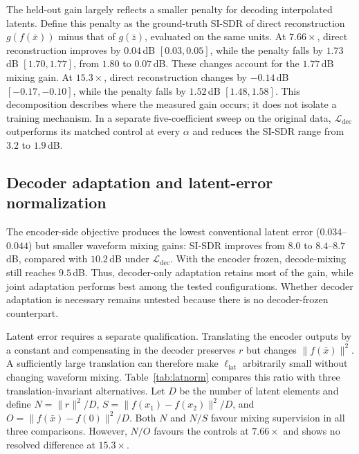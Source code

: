 \documentclass[conference]{IEEEtran}
\newcommand{\tabref}[1]{Table~\ref{#1}}
\newcommand{\Ldec}{\mathcal{L}_\mathrm{dec}}
\begin{document}
\begin{table}[tb]
  \centering\small
  \setlength{\tabcolsep}{3.0pt}
  
  \caption{GAN fine-tuning from a shared checkpoint ($7.66\times$, full
  original test set, $\alpha=0.5$; one run per configuration). SI-SDR
  subscripts follow Eqs.~\ref{eq:recmetric}--\ref{eq:consmetric}.}
  \label{tab:ablation}
\end{table}

The held-out gain largely reflects a smaller penalty for decoding
interpolated latents. Define this penalty as the ground-truth SI-SDR of
direct reconstruction $g(f(\bar{x}))$ minus that of $g(\bar{z})$, evaluated
on the same units. At $7.66\times$, direct reconstruction improves by
$0.04$\,dB $[0.03,0.05]$, while the penalty falls by $1.73$\,dB
$[1.70,1.77]$, from $1.80$ to $0.07$\,dB. These changes account for the
$1.77$\,dB mixing gain. At $15.3\times$, direct reconstruction changes by
$-0.14$\,dB $[-0.17,-0.10]$, while the penalty falls by $1.52$\,dB
$[1.48,1.58]$. This decomposition describes where the measured gain occurs;
it does not isolate a training mechanism. In a separate five-coefficient
sweep on the original data, $\Ldec$ outperforms its matched control at every
$\alpha$ and reduces the SI-SDR range from $3.2$ to $1.9$\,dB.

\subsection{Decoder adaptation and latent-error normalization}\label{sec:training}
The encoder-side objective produces the lowest conventional latent error
($0.034$--$0.044$) but smaller waveform mixing gains: SI-SDR improves from
$8.0$ to $8.4$--$8.7$\,dB, compared with $10.2$\,dB under $\Ldec$.
With the encoder frozen, decode-mixing still reaches $9.5$\,dB. Thus,
decoder-only adaptation retains most of the gain, while joint adaptation
performs best among the tested configurations. Whether decoder adaptation
is necessary remains untested because there is no decoder-frozen counterpart.

Latent error requires a separate qualification. Translating the encoder
outputs by a constant and compensating in the decoder preserves $r$ but
changes $\lVert f(\bar{x})\rVert^2$. A sufficiently large translation can
therefore make $\ell_\mathrm{lat}$ arbitrarily small without changing
waveform mixing. \tabref{tab:latnorm} compares this ratio with three
translation-invariant alternatives. Let $D$ be the number of latent elements
and define $N=\lVert r\rVert^2/D$,
$S=\lVert f(x_1)-f(x_2)\rVert^2/D$, and
$O=\lVert f(\bar{x})-f(0)\rVert^2/D$.
Both $N$ and $N/S$ favour mixing supervision in all three comparisons.
However, $N/O$ favours the controls at $7.66\times$ and shows no resolved
difference at $15.3\times$.
\end{document}
